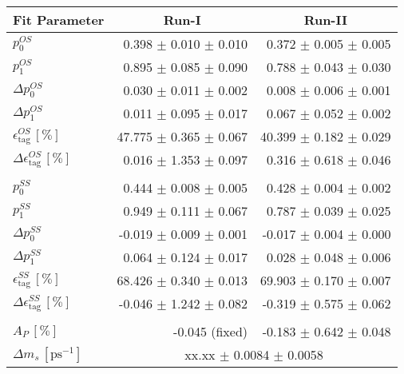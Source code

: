 \begin{tabular}{l r r } 
\hline
\hline
\multicolumn{1}{c}{Fit Parameter} & \multicolumn{1}{c}{Run-I} & \multicolumn{1}{c}{Run-II}  \\ 
\hline
$p_{0}^{OS}$ & 0.398 $\pm$ 0.010 $\pm$ 0.010 & 0.372 $\pm$ 0.005 $\pm$ 0.005 \\ 
$p_{1}^{OS}$ & 0.895 $\pm$ 0.085 $\pm$ 0.090 & 0.788 $\pm$ 0.043 $\pm$ 0.030 \\ 
$\Delta p_{0}^{OS}$ & 0.030 $\pm$ 0.011 $\pm$ 0.002 & 0.008 $\pm$ 0.006 $\pm$ 0.001 \\ 
$\Delta p_{1}^{OS}$ & 0.011 $\pm$ 0.095 $\pm$ 0.017 & 0.067 $\pm$ 0.052 $\pm$ 0.002 \\ 
$\epsilon_{\text{tag}}^{OS} \, [\%]$ & 47.775 $\pm$ 0.365 $\pm$ 0.067 & 40.399 $\pm$ 0.182 $\pm$ 0.029 \\ 
$\Delta \epsilon_{\text{tag}}^{OS} \, [\%]$ & 0.016 $\pm$ 1.353 $\pm$ 0.097 & 0.316 $\pm$ 0.618 $\pm$ 0.046 \\ 
 \\ 
$p_{0}^{SS}$ & 0.444 $\pm$ 0.008 $\pm$ 0.005 & 0.428 $\pm$ 0.004 $\pm$ 0.002 \\ 
$p_{1}^{SS}$ & 0.949 $\pm$ 0.111 $\pm$ 0.067 & 0.787 $\pm$ 0.039 $\pm$ 0.025 \\ 
$\Delta p_{0}^{SS}$ & -0.019 $\pm$ 0.009 $\pm$ 0.001 & -0.017 $\pm$ 0.004 $\pm$ 0.000 \\ 
$\Delta p_{1}^{SS}$ & 0.064 $\pm$ 0.124 $\pm$ 0.017 & 0.028 $\pm$ 0.048 $\pm$ 0.006 \\ 
$\epsilon_{\text{tag}}^{SS} \, [\%]$ & 68.426 $\pm$ 0.340 $\pm$ 0.013 & 69.903 $\pm$ 0.170 $\pm$ 0.007 \\ 
$\Delta \epsilon_{\text{tag}}^{SS} \, [\%]$ & -0.046 $\pm$ 1.242 $\pm$ 0.082 & -0.319 $\pm$ 0.575 $\pm$ 0.062 \\ 
 \\ 
$A_{P} \, [\%]$ & -0.045 (fixed) & -0.183 $\pm$ 0.642 $\pm$ 0.048 \\ 
\hline
$\Delta m_{s} \, [\text{ps}^{-1}]$ & \multicolumn{2}{c}{ xx.xx $\pm$ 0.0084 $\pm$ 0.0058 }  \\ 
\hline
\hline
\end{tabular}
